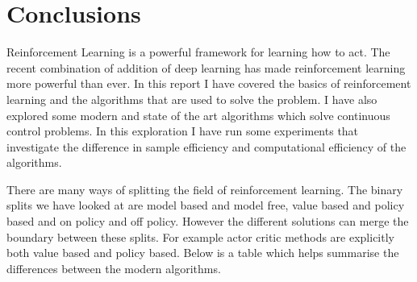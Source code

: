 \chapter{Conclusions}\label{C:con}

Reinforcement Learning is a powerful framework for learning how to act. The recent combination of addition of deep learning has made reinforcement learning more powerful than ever. In this report I have covered the basics of reinforcement learning and the algorithms that are used to solve the problem. I have also explored some modern and state of the art algorithms which solve continuous control problems. In this exploration I have run some experiments that investigate the difference in sample efficiency and computational efficiency of the algorithms.

There are many ways of splitting the field of reinforcement learning. The binary splits we have looked at are model based and model free, value based and policy based and on policy and off policy. However the different solutions can merge the boundary between these splits. For example actor critic methods are explicitly both value based and policy based. Below is a table which helps summarise the differences between the modern algorithms.

